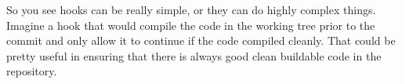 So you see hooks can be really simple, or they can do highly complex things.
Imagine a hook that would compile the code in the working tree prior to the commit and only allow it to continue if the code compiled cleanly.
That could be pretty useful in ensuring that there is always good clean buildable code in the repository.
